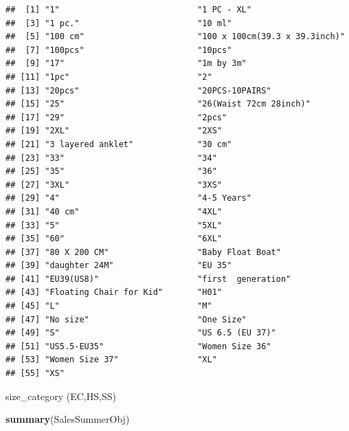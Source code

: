 \documentclass[
]{article}
\newenvironment{Shaded}{\begin{snugshade}}{\end{snugshade}}
\newcommand{\KeywordTok}[1]{\textcolor[rgb]{0.13,0.29,0.53}{\textbf{#1}}}
\newcommand{\NormalTok}[1]{#1}
\begin{document}
\begin{verbatim}
##  [1] "1"                            "1 PC - XL"                   
##  [3] "1 pc."                        "10 ml"                       
##  [5] "100 cm"                       "100 x 100cm(39.3 x 39.3inch)"
##  [7] "100pcs"                       "10pcs"                       
##  [9] "17"                           "1m by 3m"                    
## [11] "1pc"                          "2"                           
## [13] "20pcs"                        "20PCS-10PAIRS"               
## [15] "25"                           "26(Waist 72cm 28inch)"       
## [17] "29"                           "2pcs"                        
## [19] "2XL"                          "2XS"                         
## [21] "3 layered anklet"             "30 cm"                       
## [23] "33"                           "34"                          
## [25] "35"                           "36"                          
## [27] "3XL"                          "3XS"                         
## [29] "4"                            "4-5 Years"                   
## [31] "40 cm"                        "4XL"                         
## [33] "5"                            "5XL"                         
## [35] "60"                           "6XL"                         
## [37] "80 X 200 CM"                  "Baby Float Boat"             
## [39] "daughter 24M"                 "EU 35"                       
## [41] "EU39(US8)"                    "first  generation"           
## [43] "Floating Chair for Kid"       "H01"                         
## [45] "L"                            "M"                           
## [47] "No size"                      "One Size"                    
## [49] "S"                            "US 6.5 (EU 37)"              
## [51] "US5.5-EU35"                   "Women Size 36"               
## [53] "Women Size 37"                "XL"                          
## [55] "XS"
\end{verbatim}

size\_category (EC,HS,SS)

\begin{Shaded}
\begin{Highlighting}[]
\KeywordTok{summary}\NormalTok{(SalesSummerObj)}
\end{Highlighting}
\end{Shaded}
\end{document}
